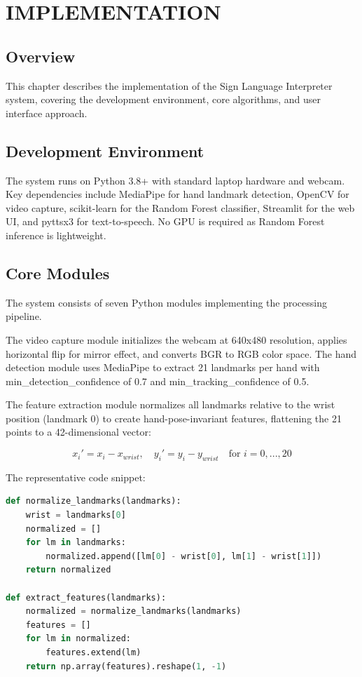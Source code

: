 \chapter{IMPLEMENTATION} \label{c5}
\justifying

\section{Overview}

This chapter describes the implementation of the Sign Language Interpreter system, covering the development environment, core algorithms, and user interface approach.

\vspace{1em}
\section{Development Environment}

The system runs on Python 3.8+ with standard laptop hardware and webcam. Key dependencies include MediaPipe for hand landmark detection, OpenCV for video capture, scikit-learn for the Random Forest classifier, Streamlit for the web UI, and pyttsx3 for text-to-speech. No GPU is required as Random Forest inference is lightweight.

\vspace{1em}
\section{Core Modules}

The system consists of seven Python modules implementing the processing pipeline.

The video capture module initializes the webcam at 640x480 resolution, applies horizontal flip for mirror effect, and converts BGR to RGB color space. The hand detection module uses MediaPipe to extract 21 landmarks per hand with min\_detection\_confidence of 0.7 and min\_tracking\_confidence of 0.5.

The feature extraction module normalizes all landmarks relative to the wrist position (landmark 0) to create hand-pose-invariant features, flattening the 21 points to a 42-dimensional vector:

\begin{equation}
x_i' = x_i - x_{wrist}, \quad y_i' = y_i - y_{wrist} \quad \text{for } i = 0, ..., 20
\end{equation}

The representative code snippet:
\begin{lstlisting}[language=Python]
def normalize_landmarks(landmarks):
    wrist = landmarks[0]
    normalized = []
    for lm in landmarks:
        normalized.append([lm[0] - wrist[0], lm[1] - wrist[1]])
    return normalized

def extract_features(landmarks):
    normalized = normalize_landmarks(landmarks)
    features = []
    for lm in normalized:
        features.extend(lm)
    return np.array(features).reshape(1, -1)
\end{lstlisting}


